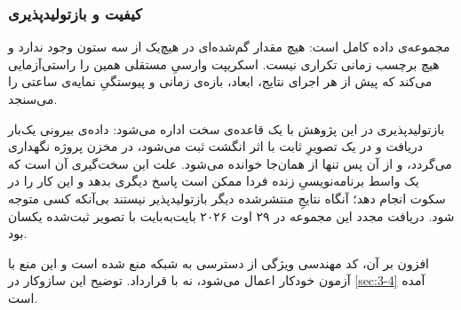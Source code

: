 \subsubsection*{کیفیت و بازتولیدپذیری}

مجموعه‌ی داده کامل است: هیچ مقدار گم‌شده‌ای در هیچ‌یک از سه ستون وجود ندارد و هیچ
برچسب زمانی تکراری نیست. اسکریپت وارسیِ مستقلی همین را راستی‌آزمایی می‌کند که
پیش از هر اجرای نتایج، ابعاد، بازه‌ی زمانی و پیوستگیِ نمایه‌ی ساعتی را می‌سنجد.

بازتولیدپذیری در این پژوهش با یک قاعده‌ی سخت اداره می‌شود: داده‌ی بیرونی یک‌بار
دریافت و در یک تصویرِ ثابت با اثر انگشت  ثبت می‌شود، در مخزن پروژه
نگهداری می‌گردد، و از آن پس تنها از همان‌جا خوانده می‌شود. علت این سخت‌گیری آن است
که یک واسط برنامه‌نویسیِ زنده فردا ممکن است پاسخ دیگری بدهد و این کار را در سکوت
انجام دهد؛ آنگاه نتایجِ منتشرشده دیگر بازتولیدپذیر نیستند بی‌آنکه کسی متوجه شود.
دریافت مجدد این مجموعه در ۲۹ اوت ۲۰۲۶ بایت‌به‌بایت با تصویر ثبت‌شده یکسان بود.

افزون بر آن، کد مهندسی ویژگی از دسترسی به شبکه منع شده است و این منع با آزمون خودکار
اعمال می‌شود، نه با قرارداد. توضیح این سازوکار در \cref{sec:3-4} آمده است.
